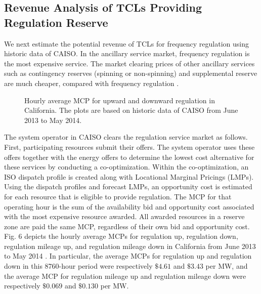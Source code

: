 \documentclass[onecolumn,journal]{IEEEtran}
\begin{document}
\subsection{Revenue Analysis of \acp{TCL} Providing Regulation Reserve}
We next estimate the potential revenue of \acp{TCL} for frequency regulation using historic data of CAISO. In the ancillary service market, frequency regulation is the most expensive service. The market clearing prices of other ancillary services such as contingency reserves (spinning or non-spinning) and supplemental reserve are much cheaper, compared with frequency regulation \cite{AS_Kirby}.

\begin{figure}[tb]
\centering
{}
\caption{Hourly average MCP for upward and downward regulation in California. The plots are based on historic data of CAISO from June 2013 to May 2014.}\label{fig:price}
\end{figure}

The system operator in \ac{CAISO} clears the regulation service market as follows. First, participating resources submit their offers. The system operator uses these offers together with the energy offers to  determine the lowest cost alternative for these services by conducting a co-optimization. Within the co-optimization, an ISO dispatch profile is created along with Locational Marginal Pricings (LMPs). Using the dispatch profiles and forecast LMPs, an opportunity cost  is estimated for each resource that is eligible to provide regulation. The \ac{MCP} for that operating hour is the sum of the availability bid and opportunity cost associated with the most expensive resource awarded. All awarded resources in a reserve zone are paid the same \ac{MCP}, regardless of their own bid and opportunity cost. Fig.  6 depicts the hourly average MCPs for regulation up, regulation down, regulation mileage up, and regulation mileage down in California from June 2013 to May 2014 \cite{OASIS}. In particular, the average MCPs for regulation up and regulation down in this 8760-hour period were respectively $\$4.61$ and $\$3.43$ per MW, and the average MCP for regulation mileage up and regulation mileage down were respectively $\$0.069$ and $\$0.130$ per MW. 
\end{document}
